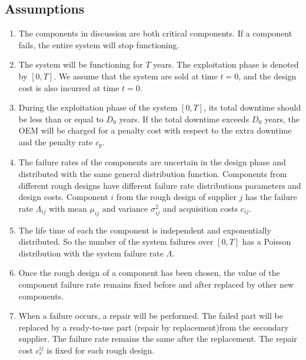 \documentclass[preprint,12pt]{elsarticle}
\begin{document}
	 \subsection{Assumptions}
	
   \begin{enumerate}
   \item The components in discussion are both critical components. If a component fails, the entire system will stop functioning.
  \item The system will be functioning for $T$ years. The exploitation phase is denoted by $[0, T]$. We assume that the system are sold at time $t=0$, and the design cost is also incurred at time $t=0$.
  \item During the exploitation phase of the system $[0, T]$, its total downtime should be less than or equal to $D_0$ years. If the total downtime exceeds $D_0$ years, the OEM will be charged for a penalty cost with respect to the extra downtime and the penalty rate $c_p$.
	 \item The failure rates of the components are uncertain in the design phase and distributed with the same general distribution function. Components from different rough designs have different failure rate distributions parameters and design costs. Component $i$ from the rough design of supplier $j$ has the failure rate $\Lambda_{ij}$ with mean $\mu_{ij}$ and variance $\sigma_{ij}^2$ and acquisition costs $c_{ij}$.
	 \item The life time of each the component is independent and exponentially distributed. So the number of the system failures over $[0, T]$ has a Poisson distribution with the system failure rate $\Lambda$.
	\item	Once the rough design of a component has been chosen, the value of the component failure rate remains fixed before and after replaced by other new components.
  \item When a failure occurs, a repair will be performed. The failed part will be replaced by a ready-to-use part (repair by replacement)from the secondary supplier. The failure rate remains the same after the replacement. The repair cost $c_r^{ij}$ is fixed for each rough design.
 	
	\end{enumerate}
\end{document}
